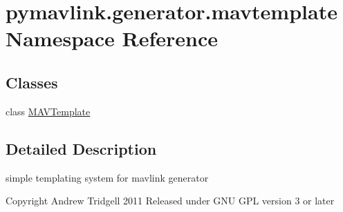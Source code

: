 \hypertarget{namespacepymavlink_1_1generator_1_1mavtemplate}{}\section{pymavlink.\+generator.\+mavtemplate Namespace Reference}
\label{namespacepymavlink_1_1generator_1_1mavtemplate}
\subsection*{Classes}
\begin{DoxyCompactItemize}
\item 
class \mbox{\hyperlink{classpymavlink_1_1generator_1_1mavtemplate_1_1MAVTemplate}{M\+A\+V\+Template}}
\end{DoxyCompactItemize}


\subsection{Detailed Description}
\begin{DoxyVerb}simple templating system for mavlink generator

Copyright Andrew Tridgell 2011
Released under GNU GPL version 3 or later
\end{DoxyVerb}
 